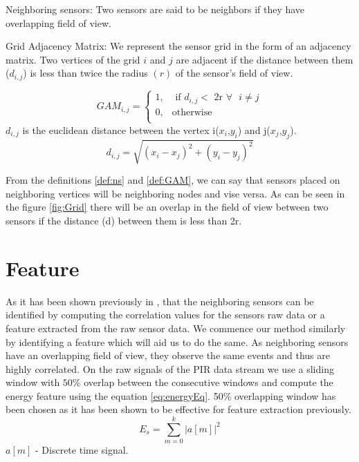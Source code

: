 \begin{definition}{Neighboring sensors:}
 Two sensors are said to be neighbors if they have overlapping field of view.
\label{def:ns}
\end{definition}
\begin{definition}{Grid Adjacency Matrix:}
 We represent the sensor grid in the form of an adjacency matrix. Two vertices of the grid $i$ and $j$ are adjacent if the distance between them ($d_{i,j}$) is less than twice the radius $(r)$ of the sensor's field of view.

\[
GAM_{i,j} = 
\begin{cases}
1, &\text{ if } d_{i,j} < \text{  2r } \forall \text{ } i \ne j\\
0, & \text{otherwise}\\
\end{cases}
    \]
$d_{i,j}$  is the euclidean distance between the vertex i($x_i$,$y_i$) and j($x_j$,$y_j$).
\begin{equation*}
d_{i,j}=\sqrt{(x_i-x_j)^2 + (y_i-y_j)^2}
\end{equation*}
\label{def:GAM}
\end{definition}
From the definitions \ref{def:ns} and \ref{def:GAM}, we can say that sensors placed on neighboring vertices will be neighboring nodes and vise versa. As can be seen in the figure \ref{fig:Grid} there will be an overlap in the field of view between two sensors if the distance (d) between them is less than 2r.

\section{Feature}
As it has been shown previously in \cite{Hong:2013:TAS:2528282.2528302,Koc:2014:CLC:2674061.2674075}, that the neighboring sensors can be identified by computing the correlation values for the sensors raw data or a feature extracted from the raw sensor data. We commence our method similarly by identifying a feature which will aid us to do the same. As neighboring sensors have an overlapping field of view, they observe the same events and thus are highly correlated. On the raw signals of the PIR data stream we use a sliding window with $50\%$ overlap between the consecutive windows and compute the energy feature using the equation \ref{eq:energyEq}. 50\% overlapping window has been chosen as it has been shown to be effective for feature extraction previously\cite{bao2004activity}.
\begin{equation}
\label{eq:energyEq}
E_s = {\sum_{m=0}^{k}{|a[m]|}^2}
\end{equation}
$a[m]$ - Discrete time signal.

